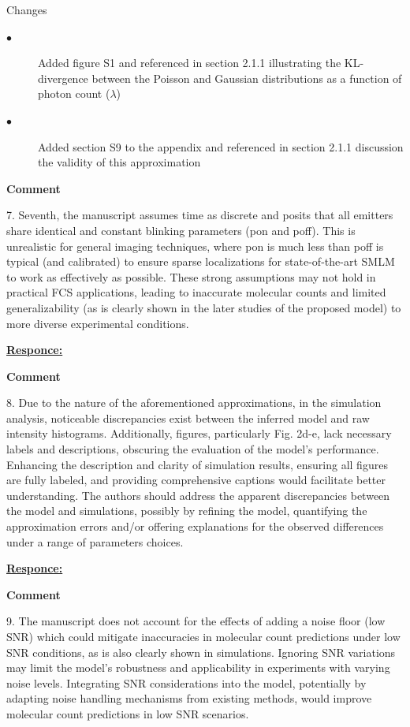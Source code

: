 \documentclass{article}
\begin{document}
Changes
\begin{description}
    \item[$\bullet$] Added figure S1 and referenced in section 2.1.1 illustrating the KL-divergence between 
    the Poisson and Gaussian distributions as a function of photon count ($\lambda$)
    \item[$\bullet$] Added section S9 to the appendix and referenced in section 2.1.1 discussion the validity of this 
    approximation
\end{description}

\textbf{Comment}

7.	Seventh, the manuscript assumes time as discrete and posits that all 
emitters share identical and constant blinking parameters (pon and poff). 
This is unrealistic for general imaging techniques, where pon is much less than poff is 
typical (and calibrated) to ensure sparse localizations for state-of-the-art 
SMLM to work as effectively as possible. These strong assumptions may not hold 
in practical FCS applications, leading to inaccurate molecular counts and limited 
generalizability (as is clearly shown in the later studies of the proposed model) 
to more diverse experimental conditions.

\underline{\textbf{Responce:}}

\textbf{Comment}

8.	Due to the nature of the aforementioned approximations, in the simulation analysis, 
noticeable discrepancies exist between the inferred model and raw intensity histograms. 
Additionally, figures, particularly Fig. 2d-e, lack necessary labels and descriptions, 
obscuring the evaluation of the model's performance. Enhancing the description and 
clarity of simulation results, ensuring all figures are fully labeled, and providing 
comprehensive captions would facilitate better understanding. 
The authors should address the apparent discrepancies between the model and simulations, 
possibly by refining the model, quantifying the approximation errors and/or offering 
explanations for the observed differences under a range of parameters choices.

\underline{\textbf{Responce:}}

\textbf{Comment}

9.	The manuscript does not account for the effects of adding a noise floor (low SNR) 
which could mitigate inaccuracies in molecular count predictions under low SNR conditions, 
as is also clearly shown in simulations. Ignoring SNR variations may limit the model's 
robustness and applicability in experiments with varying noise levels. Integrating SNR 
considerations into the model, potentially by adapting noise handling mechanisms from 
existing methods, would improve molecular count predictions in low SNR scenarios.
\end{document}
